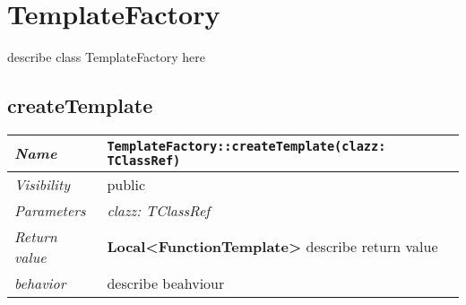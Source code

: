 \chapter{TemplateFactory}
describe class TemplateFactory here
\section{createTemplate}
\begin{longtable}{p{3cm} @{\hskip 1cm} p{12cm}}
 \hline
\textit{Name} & \texttt{TemplateFactory::createTemplate(clazz: TClassRef)}\\
\hline
 \textit{Visibility} & public\\
\hline
\textit{Parameters} & \textit{clazz: TClassRef}\\
\hline
\textit{Return value} & \textbf{ Local<FunctionTemplate>} describe return value\\
  \hline
 \textit{behavior} & describe beahviour \\
\hline
\end{longtable} \pagebreak
 